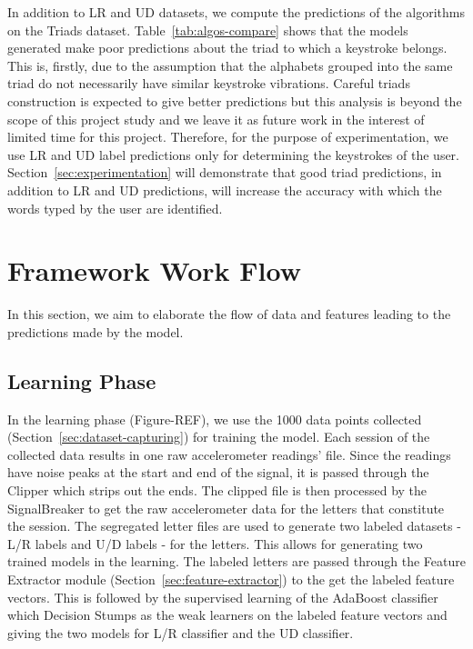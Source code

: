 \documentclass[11pt,conference]{IEEEtran}
\begin{document}
In addition to LR and UD datasets, we compute the predictions of the algorithms on the Triads dataset. Table~\ref{tab:algos-compare} shows that the models generated make poor predictions about the triad to which a keystroke belongs. This is, firstly, due to the assumption that the alphabets grouped into the same triad do not necessarily have similar keystroke vibrations. Careful triads construction is expected to give better predictions but this analysis is beyond the scope of this project study and we leave it as future work in the interest of limited time for this project. Therefore, for the purpose of experimentation, we use LR and UD label predictions only for determining the keystrokes of the user. Section~\ref{sec:experimentation} will demonstrate that good triad predictions, in addition to LR and UD predictions, will increase the accuracy with which the words typed by the user are identified. 

\section{Framework Work Flow}
\label{sec:framework}
\noindent In this section, we aim to elaborate the flow of data and features leading to the
predictions made by the model.
\subsection{Learning Phase}
\label{sec:learning}
\noindent In the learning phase (Figure-REF), we use the 1000 data points collected (Section~\ref{sec:dataset-capturing})
for training the model. Each session of the collected data results in one raw accelerometer readings' file.
Since the readings have noise peaks at the start and end of the signal, it is passed through the Clipper
which strips out the ends. The clipped file is then processed by the SignalBreaker to
get the raw accelerometer data for the letters that constitute the session. The segregated letter files are used
to generate two labeled datasets - L/R labels and U/D labels - for the letters. This allows for generating two
trained models in the learning. The labeled letters are passed through the Feature Extractor module
(Section~\ref{sec:feature-extractor}) to the get the labeled
feature vectors. This is followed by the supervised learning of the AdaBoost classifier which Decision Stumps
as the weak learners on the labeled feature vectors and giving the two models for L/R classifier and
the UD classifier.
\end{document}
